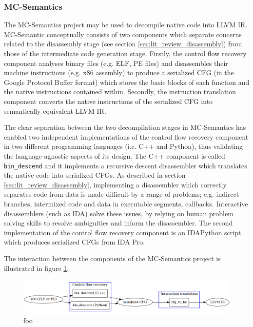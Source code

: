 
\subsubsection{MC-Semantics}
\label{sec:rel_work_mc-semantics}

The MC-Semantics project may be used to decompile native code into LLVM IR. MC-Semantic conceptually consists of two components which separate concerns related to the disassembly stage (see section \ref{sec:lit_review_disassembly}) from those of the intermediate code generation stage. Firstly, the control flow recovery component analyses binary files (e.g. ELF, PE files) and disassembles their machine instructions (e.g. x86 assembly) to produce a serialized CFG (in the Google Protocol Buffer format) which stores the basic blocks of each function and the native instructions contained within. Secondly, the instruction translation component converts the native instructions of the serialized CFG into semantically equivalent LLVM IR.

The clear separation between the two decompilation stages in MC-Semantics has enabled two independent implementations of the control flow recovery component in two different programming languages (i.e. C++ and Python), thus validating the language-agnostic aspects of its design. The C++ component is called \texttt{bin\_descend} and it implements a recursive descent disassembler which translates the native code into serialized CFGs. As described in section \ref{sec:lit_review_disassembly}, implementing a disassembler which correctly separates code from data is made difficult by a range of problems; e.g. indirect branches, intermixed code and data in executable segments, callbacks. Interactive disassemblers (such as IDA) solve these issues, by relying on human problem solving skills to resolve ambiguities and inform the disassembler. The second implementation of the control flow recovery component is an IDAPython script which produces serialized CFGs from IDA Pro.

The interaction between the components of the MC-Semantics project is illustrated in figure \ref{fig:mcsema_overview}.

\begin{figure}[htbp]
	\includegraphics[width=\textwidth]{inc/3_rel_work/mcsema_overview.png}
	\caption{foo}
	\label{fig:mcsema_overview}
\end{figure}

